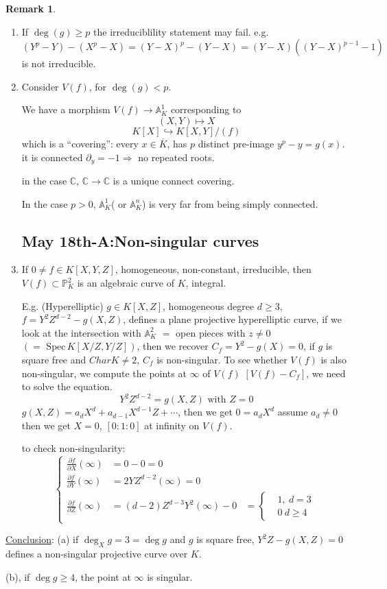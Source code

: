 \documentclass[11pt]{article}
\theoremstyle{definition}
\newtheorem{rmk}[thm]{Remark}
\newcommand{\spec}{\text{ Spec}\,}
\newcommand{\affn}{\mathbb A}
\newcommand{\proj}{\mathbb P}
\newcommand{\cplx}{\mathbb C}
\newcommand{\pd}{\partial}
\newcommand{\Lrta}{\Longrightarrow}
\newcommand{\lrta}{\longrightarrow}
\newcommand{\inj}{\hookrightarrow}
\begin{document}
\begin{rmk}\ 
\begin{enumerate}[label=(\arabic*)]
\item 
If $\deg(g)\geq p$ the irreduciblility statement may fail.
e.g. $(Y^p-Y)-(X^p-X)=(Y-X)^p-(Y-X)=(Y-X)((Y-X)^{p-1}-1)$ is not irreducible.

\item Consider $V(f)$, for $\deg(g)<p$.

We have a morphism $V(f)\lrta \affn^1_K$ corresponding to
 $$(X,Y)\longmapsto X$$
 $$
K[X]\inj K[X,Y]/(f)
 $$
 which is a ``covering'': every $x\in \overline{K}$, has $p$ distinct pre-image $y^p-y=g(x)$. it is connected $\pd_y=-1\Lrta $ no repeated roots.

in the case $\cplx$, $\cplx\lrta \cplx$ is a unique connect covering.

In the case $p>0$, $\affn^1_K$( or $\affn^n_K$) is very far from being simply connected.
\subsection{May 18th-A:Non-singular curves}
\item If $0\neq f\in K[X,Y,Z]$, homogeneous, non-constant, irreducible, then $V(f)\subset \proj^2_K$ is an algebraic curve of $K$, integral.

E.g. (Hyperelliptic) $g\in K[X,Z]$, homogeneous degree $d\geq 3$, $f=Y^2Z^{d-2}-g(X,Z)$, defines a plane projective hyperelliptic curve, if we look at the intersection with $\affn^2_K$ $=$ open pieces with $z\neq 0$ $(=\spec K[X/Z,Y/Z])$, then we recover $C_f=Y^2-g(X)=0$, if $g$ is square free and $Char K\neq 2$, $C_f$ is non-singular. To see whether  $V(f)$ is also non-singular, we compute the points at $\infty$ of $V(f)$ $[V(f)-C_f]$, we need to solve the equation. 
$$
Y^2 Z^{d-2}=g(X,Z) \text{ with } Z=0
$$
$g(X,Z)=a_d X^{d}+a_{d-1}X^{d-1}Z+\cdots$, then we get $0=a_d X^d$ assume $a_d\neq 0$ then we get $X=0$, $[0:1:0]$ at infinity on $V(f).$

to check non-singularity:
$$
\left\{
\begin{aligned}
\frac{\pd f}{\pd X}(\infty)&=0-0=0\\
\frac{\pd f}{\pd Y}(\infty)&=2YZ^{d-2}(\infty)=0\\
\frac{\pd f}{\pd Z}(\infty)&=(d-2)Z^{d-3}Y^2(\infty)-0&=\left\{
\begin{aligned}
&1, \ d=3\\
&0 \ d\geq 4
\end{aligned}
\right.
\end{aligned}
\right.
$$
\end{enumerate}
\underline{Conclusion}: (a) if $\deg_X g=3=\deg g$ and $g$ is square free, $Y^2Z-g(X,Z)=0$ defines a non-singular projective curve over $K$.

(b), if $\deg g \geq 4$, the point at  $\infty $ is singular.
\end{rmk}
\end{document}
